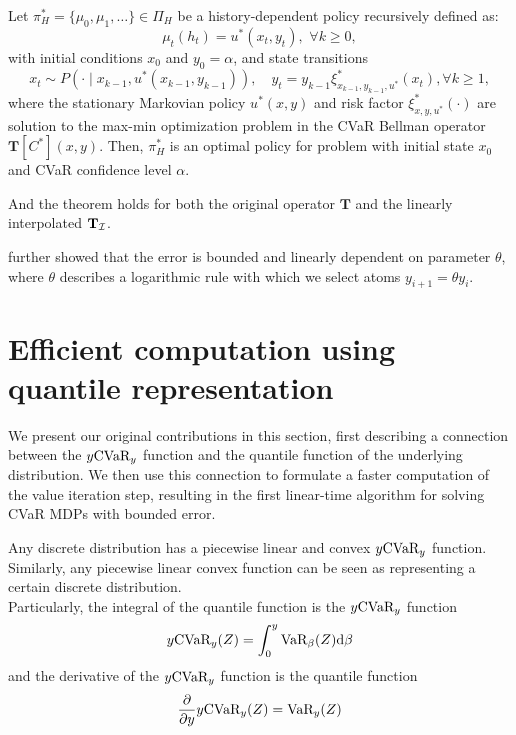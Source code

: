 \begin{theorem}\label{thm:optimalpolicy}
Let $\pi_H^*=\{\mu_0,\mu_1,\ldots\}\in\Pi_H$ be a history-dependent policy recursively defined as:
\begin{equation}\label{eqn:policy_construct}
\mu_t(h_t) = u^*(x_t, y_t),\,\,\forall k\geq 0,
\end{equation}
with initial conditions $x_0$ and $y_0=\alpha$, and state transitions
\begin{equation}\label{eqn:opt_state}
x_t\sim P(\cdot\mid x_{k-1},u^*(x_{k-1},y_{k-1})),\quad y_t = y_{k-1}\xi_{x_{k-1},y_{k-1},u^*}^*(x_t), \forall k\geq 1,
\end{equation}
where the stationary Markovian policy $u^*(x,y)$ and risk factor $\xi_{x,y,u^*}^*(\cdot)$ are solution to the  max-min optimization problem in the CVaR Bellman operator $\mathbf T[C^*](x,y)$.
Then, $\pi^*_H$ is an optimal policy for problem  with initial state $x_0$ and CVaR confidence level $\alpha$.
\end{theorem}

And the theorem holds for both the original operator $\mathbf{T}$ and the linearly interpolated $\mathbf{T}_{\mathcal{I}}$.

\citet{chow2015risk} further showed that the error is bounded and linearly dependent on parameter $\theta$, where $\theta$ describes a logarithmic rule with which we select atoms $y_{i+1}=\theta y_i$.


\section{Efficient computation using quantile representation}\label{sec:vi:linear}

We present our original contributions in this section, first describing a connection between the $y\text{CVaR}_y$ function and the quantile function of the underlying distribution. We then use this connection to formulate a faster computation of the value iteration step, resulting in the first linear-time algorithm for solving CVaR MDPs with bounded error.

\begin{lemma}\label{thm:varcvarconnection}
Any discrete distribution has a piecewise linear and convex $y\text{CVaR}_y$ function. Similarly, any piecewise linear convex function can be seen as representing a certain discrete distribution.
\\
Particularly, the integral of the quantile function is the $y\text{CVaR}_y$ function
\begin{equation}\label{eqn:varcvarintegration}
y\text{CVaR}_y(Z) = \int_0^y \text{VaR}_\beta(Z) \text{d} \beta
\end{equation}
and the derivative of the $y\text{CVaR}_y$ function is the quantile function
\begin{equation}\label{eqn:varcvarderivation}
\dfrac{\partial}{\partial y} y \text{CVaR}_y(Z) = \text{VaR}_y(Z)
\end{equation}
\end{lemma}

